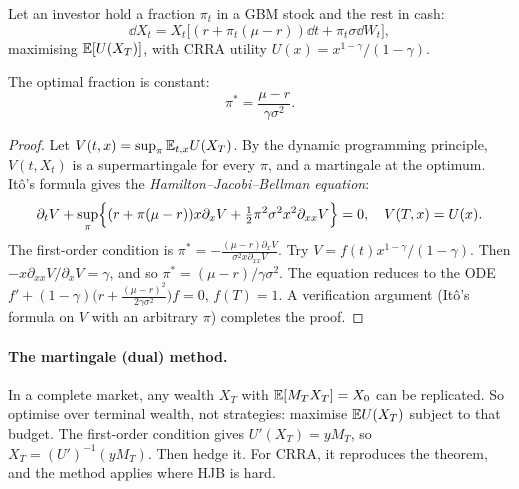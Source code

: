 Let an investor hold a fraction $\pi_t$ in a GBM stock and the rest in cash:
\[
\dd X_t=X_t\bigl[(r+\pi_t(\mu-r))\dd t+\pi_t\sigma\dd W_t\bigr],
\]
maximising $\mathbb{E}[U(X_T)]$, with CRRA utility $U(x)=x^{1-\gamma}/(1-\gamma)$.

\begin{theorem}[Merton 1969]\label{thm:mertonport}
The optimal fraction is constant:
\[
\pi^*=\frac{\mu-r}{\gamma\sigma^2}.
\]
\end{theorem}
\begin{proof}
Let $V(t,x)=\sup_\pi\mathbb{E}_{t,x}U(X_T)$. By the dynamic programming principle, $V(t,X_t)$ is a supermartingale for every $\pi$, and a martingale at the optimum. It\^o's formula gives the \emph{Hamilton--Jacobi--Bellman equation}:
\[
\partial_tV+\sup_\pi\Bigl\{(r+\pi(\mu-r))x\partial_xV+\tfrac12\pi^2\sigma^2x^2\partial_{xx}V\Bigr\}=0,\quad V(T,x)=U(x).
\]
The first-order condition is $\pi^*=-\frac{(\mu-r)\partial_xV}{\sigma^2x\partial_{xx}V}$. Try $V=f(t)x^{1-\gamma}/(1-\gamma)$. Then $-x\partial_{xx}V/\partial_xV=\gamma$, and so $\pi^*=(\mu-r)/\gamma\sigma^2$. The equation reduces to the ODE $f'+(1-\gamma)\bigl(r+\frac{(\mu-r)^2}{2\gamma\sigma^2}\bigr)f=0$, $f(T)=1$. A verification argument (It\^o's formula on $V$ with an arbitrary $\pi$) completes the proof.
\end{proof}

\paragraph{The martingale (dual) method.} In a complete market, any wealth $X_T$ with $\mathbb{E}[M_TX_T]=X_0$ can be replicated. So optimise over terminal wealth, not strategies: maximise $\mathbb{E} U(X_T)$ subject to that budget. The first-order condition gives $U'(X_T)=yM_T$, so $X_T=(U')^{-1}(yM_T)$. Then hedge it. For CRRA, it reproduces the theorem, and the method applies where HJB is hard.


